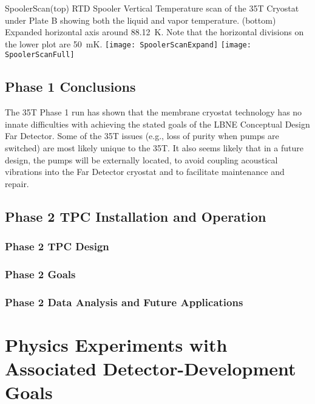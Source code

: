 \begin{cdrfigure}{SpoolerScan}{(top) RTD Spooler Vertical Temperature scan of the 35T Cryostat under Plate B showing both the liquid and vapor temperature.  (bottom) Expanded horizontal axis around 88.12~K. Note that the horizontal divisions on the lower plot are 50~mK. }
\texttt{[image: SpoolerScanExpand]}  
\texttt{[image: SpoolerScanFull]}
\end{cdrfigure}

\subsection{Phase 1 Conclusions}

The 35T Phase 1 run has shown that the membrane cryostat technology has no innate difficulties with 
achieving the stated goals of the LBNE Conceptual Design Far Detector. Some of the 35T issues (e.g., loss 
of purity when pumps are switched) are most likely unique to the 35T. It also seems likely that in a future 
design, the pumps will be externally located, to avoid coupling acoustical vibrations into the Far Detector 
cryostat and to facilitate maintenance and repair.


\subsection{Phase 2 TPC Installation and Operation}


\subsubsection{Phase 2 TPC Design }

\subsubsection{Phase 2 Goals}

\subsubsection{Phase 2 Data Analysis and Future Applications}


\section{Physics Experiments with Associated Detector-Development Goals}

